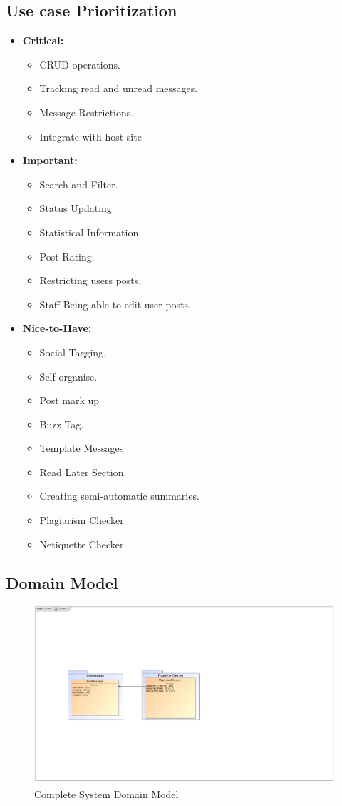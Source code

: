 \documentclass[11pt]{article}
\begin{document}
\subsection{Use case Prioritization}
\begin{itemize}
\item \textbf{Critical: }
	\begin{itemize}
		\item CRUD operations.
		\item Tracking read and unread messages.
		\item Message Restrictions.
		\item Integrate with host site
	\end{itemize}

\item \textbf{Important: }
	\begin{itemize}
		\item Search and Filter.
		\item Status Updating
		\item Statistical Information
		\item Post Rating.
		\item Restricting users posts.
		\item Staff Being able to edit user posts.
	\end{itemize}

\item \textbf{Nice-to-Have: }
	\begin{itemize}
		\item Social Tagging.
		\item Self organise.
		\item Post mark up
		\item Buzz Tag.
		\item Template Messages 
		\item Read Later Section.
		\item Creating semi-automatic summaries.
		\item Plagiarism Checker
		\item Netiquette Checker
	\end{itemize}
\end{itemize}
\newpage
\subsection{Domain Model}
\graphicspath{ {../Diagrams/} }
	  \begin{figure}[H]	
    	\includegraphics[scale=0.32]{Domain.jpg}
    	\caption{Complete System Domain Model}
	\end{figure}
\end{document}

